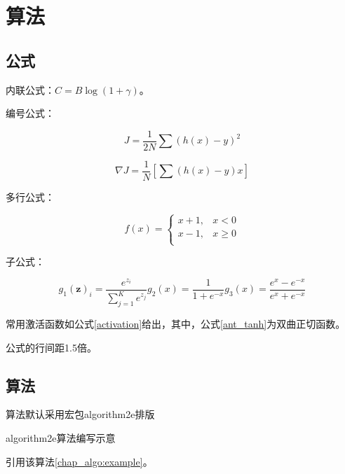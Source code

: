 \chapter{算法}

\section{公式}

内联公式：$C = B\log(1 + \gamma)$。

编号公式：

\begin{equation}
J = \frac{1}{2N}\sum(h(x) - y)^2
\end{equation}

\begin{equation}
\nabla J = \frac{1}{N}[\sum(h(x) - y)x]
\end{equation}

多行公式：

\begin{equation}
f(x) = \left\{
	\begin{aligned}
	x + 1, &x < 0\\
	x - 1, &x \geq 0\\
	\end{aligned}
\right.
\end{equation}

子公式：

\begin{subequations}\label{activation}
	\begin{equation}\label{act_softmax}
	g_1(\mathbf{z})_i = \frac{e^{z_i}}{\sum_{j = 1}^{K}e^{z_j}}
	\end{equation}
	\begin{equation}\label{ant_sigmoid}
	g_2(x) = \frac{1}{1 + e^{-x}}
	\end{equation}
	\begin{equation}\label{ant_tanh}
	g_3(x) = \frac{e^x - e^{-x}}{e^x + e^{-x}}
	\end{equation}
\end{subequations}

常用激活函数如公式\eqref{activation}给出，其中，公式\eqref{ant_tanh}为双曲正切函数。

公式的行间距1.5倍。

\section{算法}

\begin{algorithm}[!htb]
	算法默认采用宏包algorithm2e排版\;
	\BlankLine
	 {
	}
	\caption{algorithm2e算法编写示意}
	\label{chap_algo:example}
\end{algorithm}

引用该算法\ref*{chap_algo:example}。